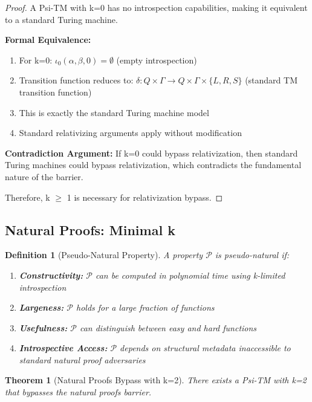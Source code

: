 \documentclass[11pt]{article}
\newtheorem{theorem}{Theorem}
\newtheorem{definition}{Definition}
\begin{document}
\begin{proof}
A Psi-TM with k=0 has no introspection capabilities, making it equivalent to a standard Turing machine.

\textbf{Formal Equivalence:}
\begin{enumerate}
\item For k=0: $\iota_0(\alpha, \beta, 0) = \emptyset$ (empty introspection)
\item Transition function reduces to: $\delta: Q \times \Gamma \to Q \times \Gamma \times \{L, R, S\}$ (standard TM transition function)
\item This is exactly the standard Turing machine model
\item Standard relativizing arguments apply without modification
\end{enumerate}

\textbf{Contradiction Argument:} If k=0 could bypass relativization, then standard Turing machines could bypass relativization, which contradicts the fundamental nature of the barrier.

Therefore, k $\geq$ 1 is necessary for relativization bypass.
\end{proof}

\subsection{Natural Proofs: Minimal k}

\begin{definition}[Pseudo-Natural Property]
A property $\mathcal{P}$ is pseudo-natural if:
\begin{enumerate}
\item \textbf{Constructivity:} $\mathcal{P}$ can be computed in polynomial time using k-limited introspection
\item \textbf{Largeness:} $\mathcal{P}$ holds for a large fraction of functions
\item \textbf{Usefulness:} $\mathcal{P}$ can distinguish between easy and hard functions
\item \textbf{Introspective Access:} $\mathcal{P}$ depends on structural metadata inaccessible to standard natural proof adversaries
\end{enumerate}
\end{definition}

\begin{theorem}[Natural Proofs Bypass with k=2]
\label{thm:natural-proofs-k2}
There exists a Psi-TM with k=2 that bypasses the natural proofs barrier.
\end{theorem}
\end{document}
